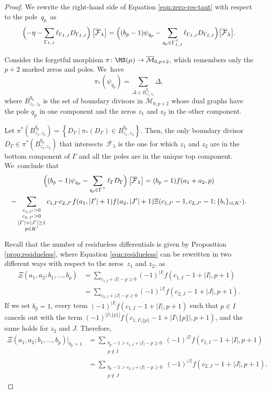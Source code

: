 \begin{proof}
We rewrite the right-hand side of Equation \eqref{eqn:zero-res-taut} with respect to the pole~$q_p$~as
\begin{equation*}
\Bigl(-\eta-\sum_{\Gamma_{I,J}}\ell_{\Gamma_{I,J}} D_{\Gamma_{I,J}}\Bigr)\left[\overline{\mathcal{F}}_{\lambda}\right]=\Bigl((b_p-1)\psi_{q_p}-\sum_{q_p\in \Gamma_{I,J}^{\top}}\ell_{\Gamma_{I,J}}D_{\Gamma_{I,J}}\Bigr)\bigl[\overline{\mathcal{F}}_{\lambda}\bigr].
\end{equation*}

Consider the forgetful morphism $\pi\colon \MS(\mu)\to \overline{\mathcal M}_{0,p+2}$, which remembers only the $p+2$ marked zeros and poles. We~have
\[
\pi_{*}(\psi_{q_p})=\sum_{\Delta \in B^{q_p}_{z_1,z_2}}\Delta,
\]
where $B^{q_p}_{z_1,z_2}$ is the set of boundary divisors in $\overline{\mathcal M}_{0,p+2}$ whose dual graphs have the pole $q_p$ in one component and the zeros $z_1$ and $z_2$ in the other component.

Let $\pi^*(B^{q_p}_{z_1,z_2}) =\left\{D_{\Gamma}\ | \ \pi_{*}(D_{\Gamma})\in B^{q_p}_{z_1,z_2}\right\}$. Then, the only boundary divisor $D_{\Gamma}\in \pi^*(B^{q_p}_{z_1,z_2})$ that intersects~$\overline{\mathcal{F}}_{\lambda}$ is the one for which $z_1$ and $z_2$ are in the bottom component of $\Gamma$ and all the poles are in the unique top component. We~conclude that\vspace*{-5pt}
\begin{multline}
\Bigl((b_p-1)\psi_{q_p}-\sum_{q_p\in \Gamma^{\top}}\ell_{\Gamma}D_{\Gamma}\Bigr)\left[\overline{\mathcal{F}}_{\lambda}\right]
=(b_p-1)f(a_1+a_2,p) \\
-\sum_{\substack{c_{1,I'}>0 \\ c_{2,J'}>0 \\ |I'|+|J'|\geq 1 \\ p\in K'}}c_{1,I'}c_{2,J'}f(a_1,|I'|+1)f(a_2,|J'|+1)\Xi(c_{1,I'}-1,c_{2,J'}-1;\{b_i\}_{i\in K'}).
\end{multline}

Recall that the number of residueless differentials is given by Proposition \ref{prop:residueless}, where Equation \eqref{eqn:residueless} can be rewritten in two different ways with respect to the zeros~$z_1$ and $z_2$, as
\begin{align*}
\Xi(a_1,a_2;b_1,\ldots,b_p) & = \sum_{c_{1,I}+|I|-p\geq 0}(-1)^{|I|}f(c_{1,I}-1+|I|,p+1)\\
& = \sum_{c_{2,J}+|J|-p\geq 0}(-1)^{|J|}f(c_{2,J}-1+|J|,p+1).
\end{align*}
If we set $b_p=1$, every term $(-1)^{|I|}f(c_{1,I}-1+|I|,p+1)$ such that $p\in I$ cancels out with the term $(-1)^{|I\setminus\{p\}|}f(c_{1,I\setminus\{p\}}-1+|I\setminus\{p\}|,p+1)$, and the same holds for $z_2$ and $J$. Therefore,
\begin{align*}
\Xi(a_1,a_2;b_1,\ldots,b_p)|_{b_p=1} & = \sum_{\substack{b_p-1>c_{1,I}+|I|-p\geq 0\\ p\notin I}}(-1)^{|I|}f(c_{1,I}-1+|I|,p+1)\\
& = \sum_{\substack{b_p-1>c_{2,J}+|I|-p\geq 0\\ p\notin J}}(-1)^{|J|}f(c_{2,J}-1+|J|,p+1).
\end{align*}


\end{proof}
